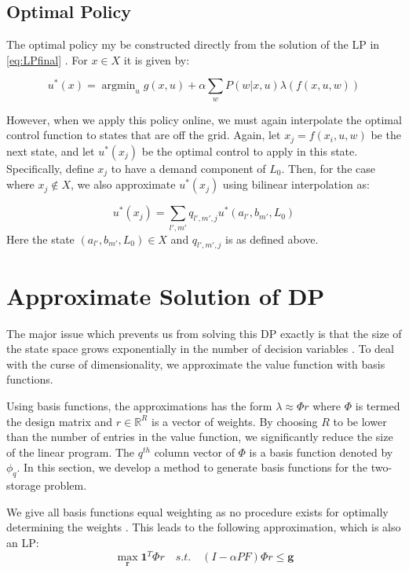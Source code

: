 \documentclass[conference]{IEEEtran}
\DeclareMathOperator*{\argmin}{argmin}
\begin{document}
\subsection{Optimal Policy}
The optimal policy my be constructed directly from the solution of the LP in \eqref{eq:LPfinal} \cite{Bertsekas:2007:DPO:1396348}. For $x\in X$ it is given by:

\begin{equation}
    u^{*}(x)=\argmin_{u} g(x,u)+\alpha \sum_{w} P(w|x,u)\lambda(f(x,u,w))
\end{equation}

However, when we apply this policy online, we must again interpolate the optimal control function to states that are off the grid. Again, let $x_{j}=f(x_{i}, u, w)$ be the next state, and let $u^{*}(x_{j})$ be the optimal control to apply in this state. Specifically, define $x_{j}$ to have a demand component of $L_{0}$. Then, for the case where $x_{j}\not\in X$, we also approximate $u^{*}(x_{j})$ using bilinear interpolation as:

\begin{equation}
    u^{*}(x_{j})=\sum_{l',m'}q_{l',m',j}u^{*}(a_{l'},b_{m'},L_{0})
\end{equation} Here the state $(a_{l'},b_{m'},L_{0})\in X$ and $q_{l',m',j}$ is as defined above.


\section{Approximate Solution of DP}
The major issue which prevents us from solving this DP exactly is that the size of the state space grows exponentially in the number of decision variables \cite{deFarias:2003:LPA:970869.970918}. To deal with the curse of dimensionality, we approximate the value function with basis functions.

Using basis functions, the approximations has the form $\lambda\approx \Phi r$ where $\Phi$ is termed the design matrix and $r\in \mathbb{R}^R$ is a vector of weights. By choosing $R$ to be lower than the number of entries in the value function, we significantly reduce the size of the linear program. The $q^{th}$ column vector of $\Phi$ is a basis function denoted by $\phi_{q}$. In this section, we develop a method to generate basis functions for the two-storage problem.

We give all basis functions equal weighting as no procedure exists for optimally determining the weights \cite{deFarias:2003:LPA:970869.970918,PatrascuReluEugen2004}. This leads to the following approximation, which is also an LP:
\begin{equation} \label{eq:ApproxLP}
    \max_{\boldsymbol{r}} \boldsymbol{1}^{T} \Phi r
    \hspace{1em}s.t.\hspace{1em}
    (I-\alpha PF)\Phi r \leq \boldsymbol{g}
\end{equation}
\end{document}
